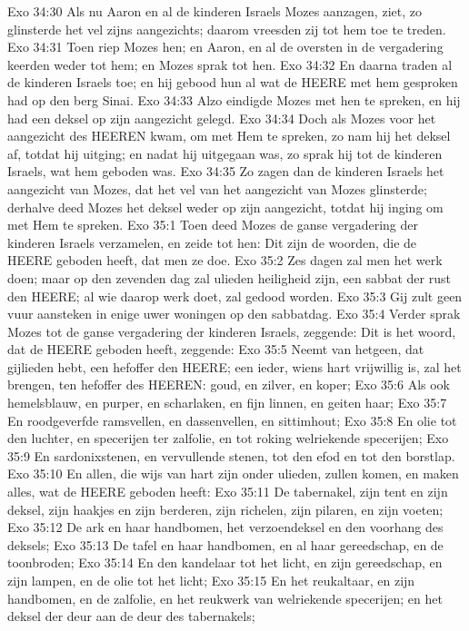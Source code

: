 Exo 34:30  Als nu Aaron en al de kinderen Israels Mozes aanzagen, ziet, zo glinsterde het vel zijns aangezichts; daarom vreesden zij tot hem toe te treden.
Exo 34:31  Toen riep Mozes hen; en Aaron, en al de oversten in de vergadering keerden weder tot hem; en Mozes sprak tot hen.
Exo 34:32  En daarna traden al de kinderen Israels toe; en hij gebood hun al wat de HEERE met hem gesproken had op den berg Sinai.
Exo 34:33  Alzo eindigde Mozes met hen te spreken, en hij had een deksel op zijn aangezicht gelegd.
Exo 34:34  Doch als Mozes voor het aangezicht des HEEREN kwam, om met Hem te spreken, zo nam hij het deksel af, totdat hij uitging; en nadat hij uitgegaan was, zo sprak hij tot de kinderen Israels, wat hem geboden was.
Exo 34:35  Zo zagen dan de kinderen Israels het aangezicht van Mozes, dat het vel van het aangezicht van Mozes glinsterde; derhalve deed Mozes het deksel weder op zijn aangezicht, totdat hij inging om met Hem te spreken.
Exo 35:1  Toen deed Mozes de ganse vergadering der kinderen Israels verzamelen, en zeide tot hen: Dit zijn de woorden, die de HEERE geboden heeft, dat men ze doe.
Exo 35:2  Zes dagen zal men het werk doen; maar op den zevenden dag zal ulieden heiligheid zijn, een sabbat der rust den HEERE; al wie daarop werk doet, zal gedood worden.
Exo 35:3  Gij zult geen vuur aansteken in enige uwer woningen op den sabbatdag.
Exo 35:4  Verder sprak Mozes tot de ganse vergadering der kinderen Israels, zeggende: Dit is het woord, dat de HEERE geboden heeft, zeggende:
Exo 35:5  Neemt van hetgeen, dat gijlieden hebt, een hefoffer den HEERE; een ieder, wiens hart vrijwillig is, zal het brengen, ten hefoffer des HEEREN: goud, en zilver, en koper;
Exo 35:6  Als ook hemelsblauw, en purper, en scharlaken, en fijn linnen, en geiten haar;
Exo 35:7  En roodgeverfde ramsvellen, en dassenvellen, en sittimhout;
Exo 35:8  En olie tot den luchter, en specerijen ter zalfolie, en tot roking welriekende specerijen;
Exo 35:9  En sardonixstenen, en vervullende stenen, tot den efod en tot den borstlap.
Exo 35:10  En allen, die wijs van hart zijn onder ulieden, zullen komen, en maken alles, wat de HEERE geboden heeft:
Exo 35:11  De tabernakel, zijn tent en zijn deksel, zijn haakjes en zijn berderen, zijn richelen, zijn pilaren, en zijn voeten;
Exo 35:12  De ark en haar handbomen, het verzoendeksel en den voorhang des deksels;
Exo 35:13  De tafel en haar handbomen, en al haar gereedschap, en de toonbroden;
Exo 35:14  En den kandelaar tot het licht, en zijn gereedschap, en zijn lampen, en de olie tot het licht;
Exo 35:15  En het reukaltaar, en zijn handbomen, en de zalfolie, en het reukwerk van welriekende specerijen; en het deksel der deur aan de deur des tabernakels;
